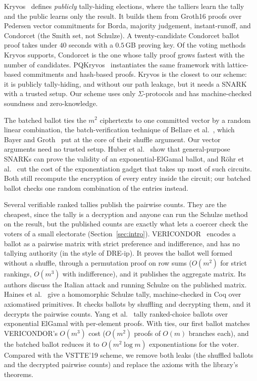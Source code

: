 Kryvos~\cite{kryvos2022} defines
\emph{publicly} tally-hiding elections, where the talliers learn the tally
and the public learns only the result. It builds them from Groth16 proofs over
Pedersen vector commitments for Borda, majority judgement, instant-runoff,
and Condorcet (the Smith set, not Schulze). A twenty-candidate Condorcet
ballot proof takes under $40$ seconds with a $0.5$\,GB proving
key. Of the voting methods Kryvos supports, Condorcet is the one whose
tally proof grows fastest with the number of candidates.
PQKryvos~\cite{pqkryvos2026} instantiates the same framework with
lattice-based commitments and hash-based proofs. Kryvos is the closest
to our scheme: it is publicly tally-hiding, and without our path
leakage, but it needs a SNARK with a trusted setup. Our scheme uses only
$\Sigma$-protocols and has machine-checked soundness and zero-knowledge.


The batched ballot ties the $m^2$ ciphertexts to one committed vector by
a random linear combination, the batch-verification technique of
Bellare et al.~\cite{bgr98}, which Bayer and
Groth~\cite{10.1007/978-3-642-29011-4_17} put at the core of their shuffle
argument. Our vector arguments need no trusted setup. Huber et al.~\cite{hklr24} show that general-purpose SNARKs can
prove the validity of an exponential-ElGamal ballot, and Röhr et
al.~\cite{rhk25} cut the cost of the exponentiation gadget that
takes up most of such circuits. Both still recompute the encryption of 
every entry inside the circuit;
our batched ballot checks one random combination of the entries
instead.

Several verifiable ranked tallies publish the pairwise counts. They are
the cheapest, since the tally is a decryption and anyone can run the
Schulze method on the result, but the published counts are exactly what
lets a coercer check the voters of a small electorate
(Section~\ref{sec:intro}). VERICONDOR~\cite{vericondor2024} encodes a ballot as a pairwise matrix
with strict preference and indifference, and has no tallying authority
(in the style of DRE-ip). It proves the ballot well formed without a
shuffle, through a permutation proof on row sums ($O(m^2)$ for strict
rankings, $O(m^3)$ with indifference), and it publishes the aggregate
matrix. Its authors discuss
the Italian attack and running Schulze on the published matrix. Haines et
al.~\cite{haines2019verifiable} give a homomorphic Schulze
tally, machine-checked in Coq over axiomatised primitives. It checks
ballots by shuffling and decrypting them, and it decrypts the pairwise
counts. Yang et
al.~\cite{yang2018ranked} tally ranked-choice ballots over exponential
ElGamal with per-element proofs. With ties, our first ballot matches VERICONDOR's $O(m^3)$ cost
($O(m^2)$ proofs of $O(m)$ branches each), and the batched ballot
reduces it to $O(m^2 \log m)$ exponentiations for the voter. Compared with the VSTTE'19 scheme, we remove both leaks (the
shuffled ballots and the decrypted pairwise counts) and replace the axioms with
the library's theorems.

